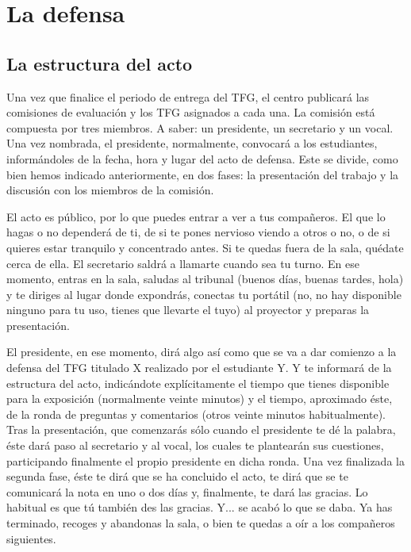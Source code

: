 \chapter{La defensa}
\label{cap:Defensa}

\section{La estructura del acto}

Una vez que finalice el periodo de entrega del TFG, el centro publicará las comisiones de evaluación y los TFG asignados a cada una. La comisión está compuesta por tres miembros. A saber: un presidente, un secretario y un vocal. Una vez nombrada, el presidente, normalmente, convocará a los estudiantes, informándoles de la fecha, hora y lugar del acto de defensa. Este se divide, como bien hemos indicado anteriormente, en dos fases: la presentación del trabajo y la discusión con los miembros de la comisión.

El acto es público, por lo que puedes entrar a ver a tus compañeros. El que lo hagas o no dependerá de ti, de si te pones nervioso viendo a otros o no, o de si quieres estar tranquilo y concentrado antes. Si te quedas fuera de la sala, quédate cerca de ella. El secretario saldrá a llamarte cuando sea tu turno. En ese momento, entras en la sala, saludas al tribunal (buenos días, buenas tardes, hola) y te diriges al lugar donde expondrás, conectas tu portátil (no, no hay disponible ninguno para tu uso, tienes que llevarte el tuyo) al proyector y preparas la presentación. 

El presidente, en ese momento, dirá algo así como que se va a dar comienzo a la defensa del TFG titulado X realizado por el estudiante Y. Y te informará de la estructura del acto, indicándote explícitamente el tiempo que tienes disponible para la exposición (normalmente veinte minutos) y el tiempo, aproximado éste, de la ronda de preguntas y comentarios (otros veinte minutos habitualmente). Tras la presentación, que comenzarás sólo cuando el presidente te dé la palabra, éste dará paso al secretario y al vocal, los cuales te plantearán sus cuestiones, participando finalmente el propio presidente en dicha ronda. Una vez finalizada la segunda fase, éste te dirá que se ha concluido el acto, te dirá que se te comunicará la nota en uno o dos días y, finalmente, te dará las gracias. Lo habitual es que tú también des las gracias. Y... se acabó lo que se daba. Ya has terminado, recoges y abandonas la sala, o bien te quedas a oír a los compañeros siguientes.

